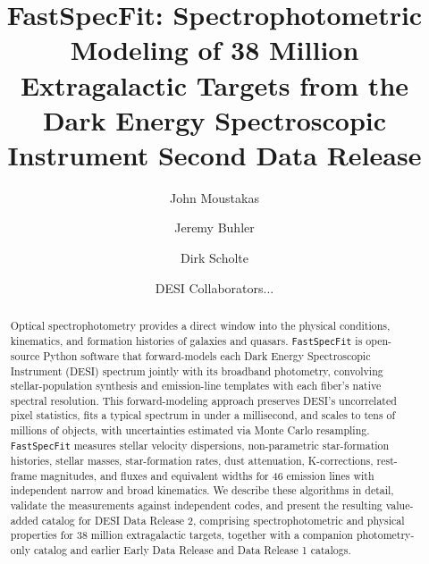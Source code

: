\documentclass[modern,linenumbers]{aastex701}
\newcommand{\fastspecfit}{\texttt{FastSpecFit}}
\begin{document}
\title{FastSpecFit: Spectrophotometric Modeling of 38 Million
  Extragalactic Targets from the Dark Energy Spectroscopic Instrument
  Second Data Release}


\author[0000-0002-2733-4559]{John Moustakas}

\author[0000-0002-4159-4226]{Jeremy Buhler}

\author[0000-0002-6867-1244]{Dirk Scholte}

\author{DESI Collaborators...}

\begin{abstract}
Optical spectrophotometry provides a direct window into the physical
conditions, kinematics, and formation histories of galaxies and
quasars. \fastspecfit{} is open-source Python software that
forward-models each Dark Energy Spectroscopic Instrument (DESI)
spectrum jointly with its broadband photometry, convolving
stellar-population synthesis and emission-line templates with each
fiber's native spectral resolution. This forward-modeling approach
preserves DESI's uncorrelated pixel statistics, fits a typical
spectrum in under a millisecond, and scales to tens of millions of
objects, with uncertainties estimated via Monte Carlo
resampling. \fastspecfit{} measures stellar velocity dispersions,
non-parametric star-formation histories, stellar masses,
star-formation rates, dust attenuation, K-corrections, rest-frame
magnitudes, and fluxes and equivalent widths for 46 emission lines
with independent narrow and broad kinematics. We describe these
algorithms in detail, validate the measurements against independent
codes, and present the resulting value-added catalog for DESI Data
Release 2, comprising spectrophotometric and physical properties for
38 million extragalactic targets, together with a companion
photometry-only catalog and earlier Early Data Release and Data
Release 1 catalogs.
\end{abstract}

\end{document}
